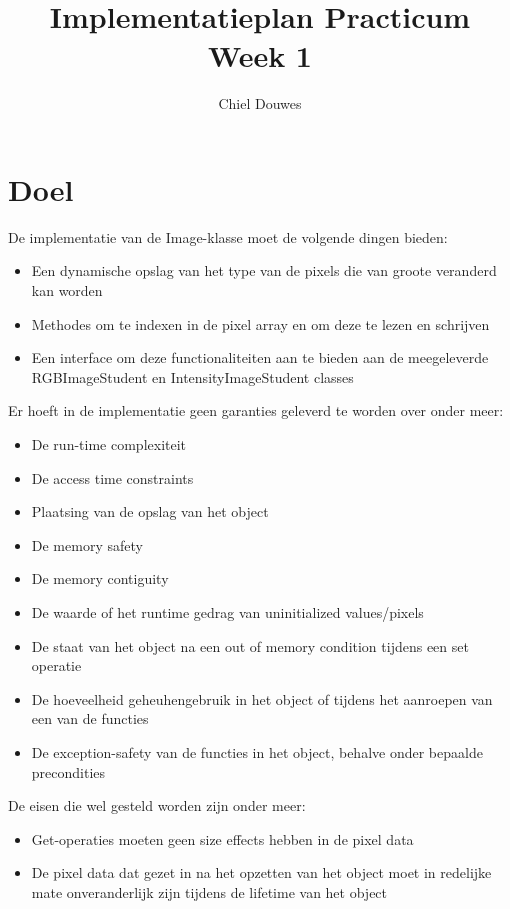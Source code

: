 \documentclass[11pt]{article}
\title{Implementatieplan Practicum Week 1}
\author{Chiel Douwes}
\begin{document}
    \maketitle


    \section{Doel}\label{sec:doel}
    De implementatie van de Image-klasse moet de volgende dingen bieden:
    \begin{itemize}
        \item Een dynamische opslag van het type van de pixels die van groote veranderd kan worden
        \item Methodes om te indexen in de pixel array en om deze te lezen en schrijven
        \item Een interface om deze functionaliteiten aan te bieden aan de meegeleverde
        RGBImageStudent en IntensityImageStudent classes
    \end{itemize}
    Er hoeft in de implementatie geen garanties geleverd te worden over onder meer:
    \begin{itemize}
        \item De run-time complexiteit
        \item De access time constraints
        \item Plaatsing van de opslag van het object
        \item De memory safety
        \item De memory contiguity
        \item De waarde of het runtime gedrag van uninitialized values/pixels
        \item De staat van het object na een out of memory condition tijdens een set operatie
        \item De hoeveelheid geheuhengebruik in het object of tijdens het aanroepen van een van
        de functies
        \item De exception-safety van de functies in het object, behalve onder bepaalde precondities
    \end{itemize}
    De eisen die wel gesteld worden zijn onder meer:
    \begin{itemize}
        \item Get-operaties moeten geen size effects hebben in de pixel data
        \item De pixel data dat gezet in na het opzetten van het object moet in redelijke mate
        onveranderlijk zijn tijdens de lifetime van het object
    \end{itemize}
\end{document}
